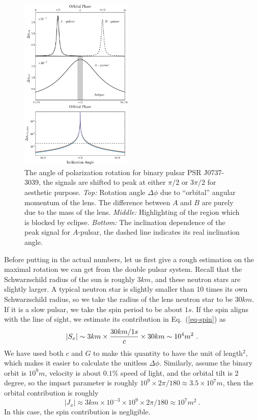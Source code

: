 \documentclass[aps,showpacs,twocolumn,floats,prd,superscriptaddress,nofootinbib]{revtex4}
\begin{document}
\begin{figure}
\includegraphics[width=0.48\textwidth]{rotang.eps}
\caption{\label{fig:rotang}
The angle of polarization rotation for binary pulsar PSR J0737-3039, the signals are shifted to peak at either $\pi/2$ or  $3\pi/2$ for aesthetic purpose. 
{\it Top:} Rotation angle $\Delta \phi$ due to ``orbital'' angular momentum of the lens.
The difference between $A$ and $B$ are purely due to the mass of the lens. 
{\it Middle:} Highlighting of the region which is blocked by eclipse. 
{\it Bottom:}  The inclination dependence of the peak signal for $A$-pulsar, the dashed line indicates its real inclination angle.
 }
\end{figure}

Before putting in the actual numbers, let us first give a rough estimation on the maximal rotation we can get from the double pulsar system.
Recall that the Schwarzschild radius of the sun is roughly $3km$, and these neutron stars are slightly larger.
A typical neutron star is slightly smaller than 10 times its own Schwarzschild radius, so we take the radius of the lens neutron star to be $30km$.
If it is a slow pulsar, we take the spin period to be about $1s$.
If the spin aligns with the line of sight, we estimate its contribution in Eq.~(\ref{eq-spin}) as
\begin{equation}
|S_x|  \sim  3km \times \frac{30km/1s}{c} \times 30km \sim 10^4 m^2~. \nonumber \\
{\color{red}   
}
\end{equation}
We have used both $c$ and $G$ to make this quantity to have the unit of length$^2$, which makes it easier to calculate the unitless $\Delta\phi$.
Similarly, assume the binary orbit is $10^9 m$, velocity is about $0.1\%$ speed of light, and the orbital tilt is $2$ degree, so the impact parameter is roughly $10^9 \times 2\pi/180 \approx 3.5 \times 10^7 m$, then the orbital contribution is roughly
\begin{equation}
|J_x| \approx  3km \times 10^{-3} \times 10^9 \times 2\pi/180  \approx 10^7 m^2~.
\end{equation}
In this case, the spin contribution is negligible.
\end{document}
